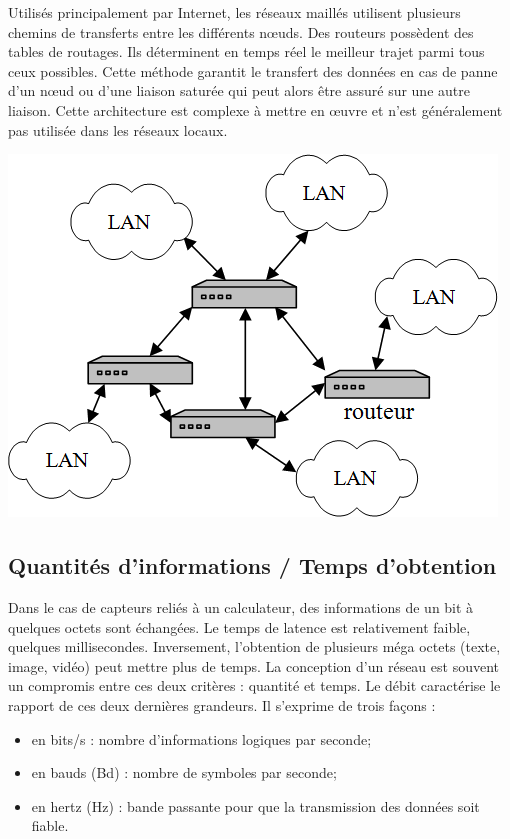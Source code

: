 \documentclass[10pt]{article}
\begin{document}
\begin{minipage}[c]{.66\linewidth}
Utilisés principalement par Internet, les réseaux maillés utilisent plusieurs chemins de transferts entre les différents nœuds. Des routeurs possèdent des tables de routages. Ils déterminent en temps réel le meilleur trajet parmi tous ceux possibles. Cette méthode garantit le transfert des données en cas de panne d'un nœud ou d’une liaison saturée qui  peut alors être assuré sur une autre liaison. Cette architecture est complexe à mettre en œuvre et n’est généralement pas utilisée dans les réseaux locaux.
\end{minipage} \hfill
\begin{minipage}[c]{.3\linewidth}
\begin{center}
\includegraphics[width=.95\textwidth]{images/fig_04}
\end{center}
\end{minipage} 

\subsection{Quantités d’informations / Temps d’obtention}
Dans le cas de capteurs reliés à un calculateur, des informations de un bit à quelques octets sont échangées. Le temps de latence est relativement faible, quelques millisecondes. Inversement, l’obtention de plusieurs méga octets (texte, image, vidéo) peut mettre plus de temps. La conception d’un réseau est souvent un compromis entre ces deux critères : quantité et temps.
Le débit caractérise le rapport de ces deux dernières grandeurs. Il s’exprime de trois façons :
\begin{itemize}
\item en bits/s : nombre d’informations logiques par seconde;
\item en bauds (Bd) : nombre de symboles par seconde;
\item en hertz (Hz) : bande passante pour que la transmission des données soit fiable.
\end{itemize}
\end{document}
